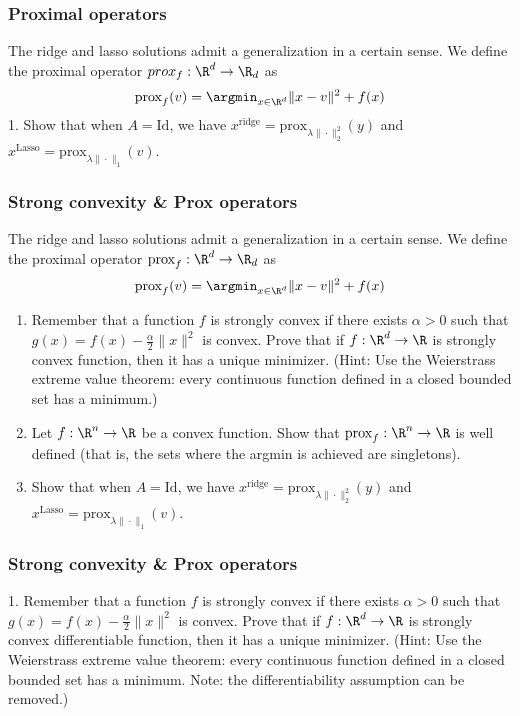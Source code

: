 \documentclass{beamer}
\begin{document}
\iffalse
\begin{frame}[t]
\frametitle{Proximal operators}
The ridge and lasso solutions admit a generalization in a certain sense. We define the proximal operator $prox_f : \R^d \rightarrow \R_d$ as
\begin{align*}
\text{prox}_f(v) = \argmin_{x \in \R^d} \|x-v\|^2 + f(x)
\end{align*}
1. Show that when $A=\text{Id}$, we have $x^{\text{ridge}} = \text{prox}_{\lambda \|\cdot\|_2^2}(y)$ and $x^{\text{Lasso}} = \text{prox}_{\lambda \|\cdot\|_1}(v)$.
\pause
\end{frame}

\begin{frame}[t]
\frametitle{Strong convexity \& Prox operators}
\vspace{-5pt}
The ridge and lasso solutions admit a generalization in a certain sense. We define the proximal operator $\text{prox}_f : \R^d \rightarrow \R_d$ as
\begin{align*}
\text{prox}_f(v) = \argmin_{x \in \R^d} \|x-v\|^2 + f(x)
\end{align*}
\begin{enumerate}
\item Remember that a function $f$ is strongly convex if there exists $\alpha > 0$ such that $g(x) = f(x) - \frac{\alpha}{2} \|x\|^2$ is convex. Prove that if $f : \R^d \rightarrow \R$ is strongly convex function, then it has a unique minimizer. (Hint: Use the Weierstrass extreme value theorem: every continuous function defined in a closed bounded set has a minimum.)
\item Let $f : \R^n \rightarrow \R$ be a convex function. Show that $\text{prox}_f : \R^n \rightarrow \R$ is well defined (that is, the sets where the argmin is achieved are singletons).
\item Show that when $A=\text{Id}$, we have $x^{\text{ridge}} = \text{prox}_{\lambda \|\cdot\|_2^2}(y)$ and $x^{\text{Lasso}} = \text{prox}_{\lambda \|\cdot\|_1}(v)$.
\end{enumerate}
\pause
\end{frame}

\begin{frame}[t]
\frametitle{Strong convexity \& Prox operators}
\vspace{-5pt}
1. Remember that a function $f$ is strongly convex if there exists $\alpha > 0$ such that $g(x) = f(x) - \frac{\alpha}{2} \|x\|^2$ is convex. Prove that if $f : \R^d \rightarrow \R$ is strongly convex differentiable function, then it has a unique minimizer. (Hint: Use the Weierstrass extreme value theorem: every continuous function defined in a closed bounded set has a minimum. Note: the differentiability assumption can be removed.)
\pause
\pause
\end{frame}
\end{document}
